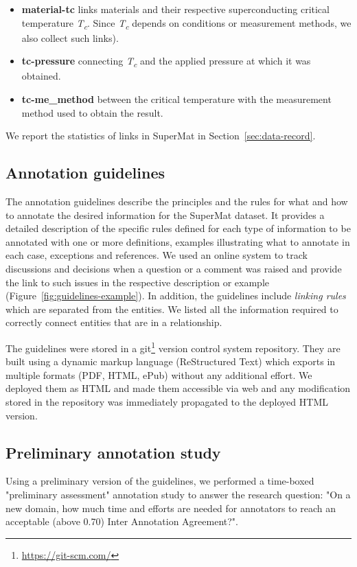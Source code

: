 \documentclass[fleqn,10pt]{wlscirep}
\begin{document}
\begin{itemize}
    \item \textbf{material-tc} links materials and their respective superconducting critical temperature \textit{T\textsubscript{c}}. Since \textit{T\textsubscript{c}} depends on conditions or measurement methods, we also collect such links).
    \item \textbf{tc-pressure} connecting \textit{T\textsubscript{c}} and the applied pressure at which it was obtained.
    \item \textbf{tc-me\_method} between the critical temperature with the measurement method used to obtain the result. 
\end{itemize}

We report the statistics of links in SuperMat in Section~\ref{sec:data-record}.

\subsection*{Annotation guidelines}
\label{subsec:annotation-guidelines}
The annotation guidelines describe the principles and the rules for what and how to annotate the desired information for the SuperMat dataset. It provides a detailed description of the specific rules defined for each type of information to be annotated with one or more definitions, examples illustrating what to annotate in each case, exceptions and references. We used an online system to track discussions and decisions when a question or a comment was raised and provide the link to such issues in the respective description or example (Figure~\ref{fig:guidelines-example}). In addition, the guidelines include \textit{linking rules} which are separated from the entities. We listed all the information required to correctly connect entities that are in a relationship. 

The guidelines were stored in a git\footnote{\url{https://git-scm.com/}} version control system repository. They are built using a dynamic markup language (ReStructured Text) which exports in multiple formats (PDF, HTML, ePub) without any additional effort. We deployed them as HTML and made them accessible via web and any modification stored in the repository was immediately propagated to the deployed HTML version. 

\subsection*{Preliminary annotation study}
\label{subsec:preliminary-annotation-study}
Using a preliminary version of the guidelines, we performed a time-boxed "preliminary assessment" annotation study to answer the research question: "On a new domain, how much time and efforts are needed for annotators to reach an acceptable (above 0.70) Inter Annotation Agreement?".
\end{document}
